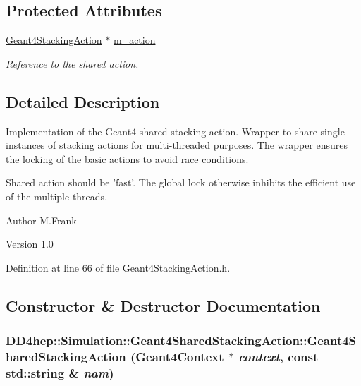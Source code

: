 \subsection*{Protected Attributes}
\begin{DoxyCompactItemize}
\item 
\hyperlink{class_d_d4hep_1_1_simulation_1_1_geant4_stacking_action}{Geant4StackingAction} $\ast$ \hyperlink{class_d_d4hep_1_1_simulation_1_1_geant4_shared_stacking_action_a3f3be5f46d2ee56467337edf438fc153}{m\_\-action}
\begin{DoxyCompactList}\small\item\em Reference to the shared action. \item\end{DoxyCompactList}\end{DoxyCompactItemize}


\subsection{Detailed Description}
Implementation of the Geant4 shared stacking action. Wrapper to share single instances of stacking actions for multi-\/threaded purposes. The wrapper ensures the locking of the basic actions to avoid race conditions.

Shared action should be 'fast'. The global lock otherwise inhibits the efficient use of the multiple threads.

\begin{DoxyAuthor}{Author}
M.Frank 
\end{DoxyAuthor}
\begin{DoxyVersion}{Version}
1.0 
\end{DoxyVersion}


Definition at line 66 of file Geant4StackingAction.h.

\subsection{Constructor \& Destructor Documentation}
\hypertarget{class_d_d4hep_1_1_simulation_1_1_geant4_shared_stacking_action_a555935d842ff0a023c1bf80592ad086e}{
\subsubsection[{Geant4SharedStackingAction}]{\setlength{\rightskip}{0pt plus 5cm}DD4hep::Simulation::Geant4SharedStackingAction::Geant4SharedStackingAction ({\bf Geant4Context} $\ast$ {\em context}, \/  const std::string \& {\em nam})}}
\label{class_d_d4hep_1_1_simulation_1_1_geant4_shared_stacking_action_a555935d842ff0a023c1bf80592ad086e}


